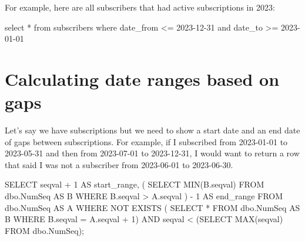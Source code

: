 \documentclass[
  letterpaper,
  DIV=11,
  numbers=noendperiod]{scrreprt}
\newenvironment{Shaded}{\begin{snugshade}}{\end{snugshade}}
\newcommand{\DecValTok}[1]{\textcolor[rgb]{0.68,0.00,0.00}{#1}}
\newcommand{\FunctionTok}[1]{\textcolor[rgb]{0.28,0.35,0.67}{#1}}
\newcommand{\KeywordTok}[1]{\textcolor[rgb]{0.00,0.23,0.31}{#1}}
\newcommand{\NormalTok}[1]{\textcolor[rgb]{0.00,0.23,0.31}{#1}}
\newcommand{\OperatorTok}[1]{\textcolor[rgb]{0.37,0.37,0.37}{#1}}
\newcommand{\StringTok}[1]{\textcolor[rgb]{0.13,0.47,0.30}{#1}}
\begin{document}
For example, here are all subscribers that had active subscriptions in
2023:

\begin{Shaded}
\begin{Highlighting}[]

\KeywordTok{select} \OperatorTok{*}
\KeywordTok{from}\NormalTok{ subscribers}
\KeywordTok{where}\NormalTok{ date\_from }\OperatorTok{\textless{}=} \StringTok{\textquotesingle{}2023{-}12{-}31\textquotesingle{}}
\KeywordTok{and}\NormalTok{ date\_to }\OperatorTok{\textgreater{}=} \StringTok{\textquotesingle{}2023{-}01{-}01\textquotesingle{}}
\end{Highlighting}
\end{Shaded}


\hypertarget{calculating-date-ranges-based-on-gaps}{%
\chapter{Calculating date ranges based on
gaps}\label{calculating-date-ranges-based-on-gaps}}

Let's say we have subscriptions but we need to show a start date and an
end date of gaps between subscriptions. For example, if I subscribed
from 2023-01-01 to 2023-05-31 and then from 2023-07-01 to 2023-12-31, I
would want to return a row that said I was not a subscriber from
2023-06-01 to 2023-06-30.

\begin{Shaded}
\begin{Highlighting}[]
\KeywordTok{SELECT}   
\NormalTok{  seqval }\OperatorTok{+} \DecValTok{1} \KeywordTok{AS}\NormalTok{ start\_range,   }
\NormalTok{  (}
    \KeywordTok{SELECT} 
      \FunctionTok{MIN}\NormalTok{(B.seqval)    }
    \KeywordTok{FROM}\NormalTok{ dbo.NumSeq }\KeywordTok{AS}\NormalTok{ B    }
    \KeywordTok{WHERE}\NormalTok{ B.seqval }\OperatorTok{\textgreater{}}\NormalTok{ A.seqval}
\NormalTok{    ) }\OperatorTok{{-}} \DecValTok{1} \KeywordTok{AS}\NormalTok{ end\_range }
\KeywordTok{FROM}\NormalTok{ dbo.NumSeq }\KeywordTok{AS}\NormalTok{ A }
\KeywordTok{WHERE} \KeywordTok{NOT} \KeywordTok{EXISTS}\NormalTok{ (}
  \KeywordTok{SELECT} \OperatorTok{*} \KeywordTok{FROM}\NormalTok{ dbo.NumSeq }\KeywordTok{AS}\NormalTok{ B    }
  \KeywordTok{WHERE}\NormalTok{ B.seqval }\OperatorTok{=}\NormalTok{ A.seqval }\OperatorTok{+} \DecValTok{1}\NormalTok{)}
\KeywordTok{AND}\NormalTok{ seqval }\OperatorTok{\textless{}}\NormalTok{ (}\KeywordTok{SELECT} \FunctionTok{MAX}\NormalTok{(seqval) }\KeywordTok{FROM}\NormalTok{ dbo.NumSeq);}
\end{Highlighting}
\end{Shaded}
\end{document}

